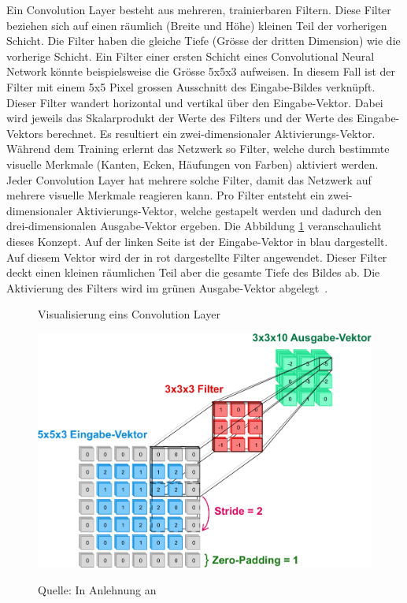 Ein Convolution Layer besteht aus mehreren, trainierbaren Filtern. Diese Filter beziehen sich auf einen räumlich (Breite und Höhe) kleinen Teil der vorherigen Schicht. Die Filter haben die gleiche Tiefe (Grösse der dritten Dimension) wie die vorherige Schicht. Ein Filter einer ersten Schicht eines Convolutional Neural Network könnte beispielsweise die Grösse 5x5x3 aufweisen. In diesem Fall ist der Filter mit einem 5x5 Pixel grossen Ausschnitt des Eingabe-Bildes verknüpft. Dieser Filter wandert horizontal und vertikal über den Eingabe-Vektor. Dabei wird jeweils das Skalarprodukt der Werte des Filters und der Werte des Eingabe-Vektors berechnet. Es resultiert ein zwei-dimensionaler Aktivierungs-Vektor. Während dem Training erlernt das Netzwerk so Filter, welche durch bestimmte visuelle Merkmale (Kanten, Ecken, Häufungen von Farben) aktiviert werden. Jeder Convolution Layer hat mehrere solche Filter, damit das Netzwerk auf mehrere visuelle Merkmale reagieren kann. Pro Filter entsteht ein zwei-dimensionaler Aktivierungs-Vektor, welche gestapelt werden und dadurch den drei-dimensionalen Ausgabe-Vektor ergeben. Die Abbildung \ref{fig:conv:vis} veranschaulicht dieses Konzept. Auf der linken Seite ist der Eingabe-Vektor in blau dargestellt. Auf diesem Vektor wird der in rot dargestellte Filter angewendet. Dieser Filter deckt einen kleinen räumlichen Teil aber die gesamte Tiefe des Bildes ab. Die Aktivierung des Filters wird im grünen Ausgabe-Vektor abgelegt~\autocite{CNN}.


\begin{figure}[h!]
    \captionsetup{width=.9\linewidth}
    \caption{Visualisierung eins Convolution Layer}
    \label{fig:conv:vis}
    \centering
    \includegraphics[scale=0.5]{graphics/cnn-visual.pdf}\\
    \caption*{Quelle: In Anlehnung an \textcite{CNN}}
    \vspace*{0.5cm}
\end{figure}

